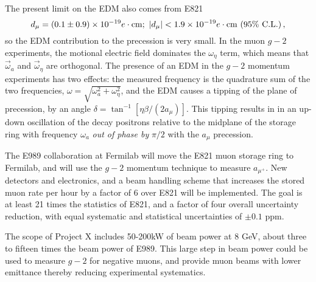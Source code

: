 The present limit on the EDM also comes from E821~\cite{Bennett08-edm}
\begin{equation}
d_\mu = (0.1 \pm 0.9) \times 10^{-19} e  \cdot {\rm cm}; \
 \vert d_\mu \vert < 1.9 \times 10^{-19}  e  \cdot {\rm cm}\ (95\%\ {\rm C.L.})\, ,
\label{muedm-result}
\end{equation}
so the EDM contribution to the precession is very small.  In the muon $g-2$
experiments, the motional electric field dominates the $\omega_\eta$ term,
which means that $\vec \omega_a$ and $\vec \omega_\eta$ are orthogonal.
The presence of an EDM in the  $g-2$ momentum experiments has two effects:
the measured frequency is the quadrature sum of the two frequencies,
 $\omega = \sqrt{\omega_a^2 + \omega_\eta^2}$, and the EDM causes a tipping of
 the plane of precession, by an angle
 $\delta = \tan ^{-1}[ \eta \beta/(2a_\mu)]$. This tipping results in
 in an up-down oscillation of the decay
 positrons relative to the midplane of the storage ring with frequency
$\omega_a$ {\it out of phase by} $\pi/2$ with the $a_\mu$ precession.

The E989 collaboration
at Fermilab will move the E821 muon storage ring to Fermilab, and
will use the  $g-2$ momentum technique to measure $a_{\mu^+}$.
 New detectors and electronics, and a
beam handling scheme that increases the stored muon rate per hour
 by a factor of 6
over E821 will be implemented.  The goal is at least 21 times the
statistics of E821, and a factor of four overall uncertainty reduction, with
equal systematic and statistical uncertainties of $\pm 0.1$ ppm.

The scope of Project X includes 50-200kW of beam power at 8 GeV,
about three to fifteen times the beam power of E989.  This large step in beam
power could be used to measure $g-2$ for negative muons,
and provide muon beams with lower emittance thereby reducing
experimental systematics. 

